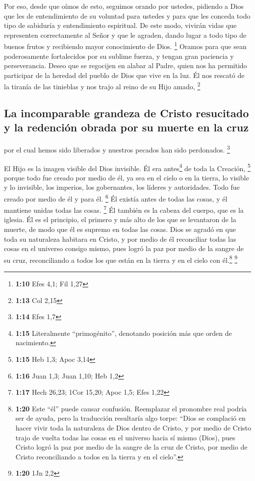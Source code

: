  Por eso, desde que oímos de esto, seguimos orando por
ustedes, pidiendo a Dios que les de entendimiento de su voluntad para
ustedes y para que les conceda todo tipo de sabiduría y entendimiento
espiritual.  De este modo, vivirán vidas que representen
correctamente al Señor y que le agraden, dando lugar a todo tipo de
buenos frutos y recibiendo mayor conocimiento de Dios. \footnote{\textbf{1:10}
  Efes 4,1; Fil 1,27}  Oramos para que sean poderosamente
fortalecidos por su sublime fuerza, y tengan gran paciencia y
perseverancia.  Deseo que se regocijen en alabar al
Padre, quien nos ha permitido participar de la heredad del pueblo de
Dios que vive en la luz.  Él nos rescató de la tiranía de
las tinieblas y nos trajo al reino de su Hijo amado, \footnote{\textbf{1:13}
  Col 2,15}

\hypertarget{la-incomparable-grandeza-de-cristo-resucitado-y-la-redenciuxf3n-obrada-por-su-muerte-en-la-cruz}{%
\subsection{La incomparable grandeza de Cristo resucitado y la redención
obrada por su muerte en la
cruz}\label{la-incomparable-grandeza-de-cristo-resucitado-y-la-redenciuxf3n-obrada-por-su-muerte-en-la-cruz}}

 por el cual hemos sido liberados y nuestros pecados han
sido perdonados. \footnote{\textbf{1:14} Efes 1,7}

 El Hijo es la imagen visible del Dios invisible. Él era
antes\footnote{\textbf{1:15} Literalmente ``primogénito'', denotando
  posición más que orden de nacimiento.} de toda la Creación,
\footnote{\textbf{1:15} Heb 1,3; Apoc 3,14}  porque todo
fue creado por medio de él, ya sea en el cielo o en la tierra, lo
visible y lo invisible, los imperios, los gobernantes, los líderes y
autoridades. Todo fue creado por medio de él y para él. \footnote{\textbf{1:16}
  Juan 1,3; Juan 1,10; Heb 1,2}  Él existía antes de
todas las cosas, y él mantiene unidas todas las cosas. \footnote{\textbf{1:17}
  Hech 26,23; 1Cor 15,20; Apoc 1,5; Efes 1,22}  Él
también es la cabeza del cuerpo, que es la iglesia. Él es el principio,
el primero y más alto de los que se levantaron de la muerte, de modo que
él es supremo en todas las cosas.  Dios se agradó en que
toda su naturaleza habitara en Cristo,  y por medio de él
reconciliar todas las cosas en el universo consigo mismo, pues logró la
paz por medio de la sangre de su cruz, reconciliando a todos los que
están en la tierra y en el cielo con él.\footnote{\textbf{1:20} Este
  ``él'' puede causar confusión. Reemplazar el pronombre real podría ser
  de ayuda, pero la traducción resultaría algo torpe: ``Dios se
  complació en hacer vivir toda la naturaleza de Dios dentro de Cristo,
  y por medio de Cristo trajo de vuelta todas las cosas en el universo
  hacia sí mismo (Dios), pues Cristo logró la paz por medio de la sangre
  de la cruz de Cristo, por medio de Cristo reconciliando a todos en la
  tierra y en el cielo''.} \footnote{\textbf{1:20} 1Jn 2,2}

